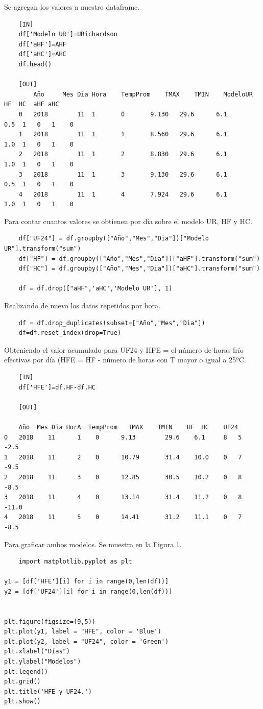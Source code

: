 \documentclass[11pt, spanish]{report}
\begin{document}
Se agregan los valores a nuestro dataframe.
\begin{verbatim}
    [IN]
    df['Modelo UR']=URichardson
    df['aHF']=AHF
    df['aHC']=AHC
    df.head()
    
    [OUT]
        Año     Mes	Dia	Hora	TempProm	TMAX	TMIN	ModeloUR	HF	HC	aHF	aHC
    0	2018        11	1   	0	    9.130	29.6	  6.1	    0.5	 1	 0	 1	  0
    1	2018        11	1   	1	    8.560	29.6	  6.1	    1.0	 1	 0	 1	  0
    2	2018        11	1   	2	    8.830	29.6	  6.1	    1.0	 1	 0	 1	  0
    3	2018        11	1   	3	    9.130	29.6	  6.1	    0.5	 1	 0	 1	  0
    4	2018        11	1   	4	    7.924	29.6	  6.1	    1.0	 1	 0	 1	  0
\end{verbatim}
Para contar cuantos valores se obtienen por día sobre el modelo UR, HF y HC.
\begin{verbatim}
    df["UF24"] = df.groupby(["Año","Mes","Dia"])["Modelo UR"].transform("sum")
    df["HF"] = df.groupby(["Año","Mes","Dia"])["aHF"].transform("sum")
    df["HC"] = df.groupby(["Año","Mes","Dia"])["aHC"].transform("sum")
    
    df = df.drop(["aHF",'aHC','Modelo UR'], 1)
\end{verbatim}
Realizando de nuevo los datos repetidos por hora.
\begin{verbatim}
    df = df.drop_duplicates(subset=["Año","Mes","Dia"])
    df=df.reset_index(drop=True)
\end{verbatim}
Obteniendo el valor acumulado para UF24 y HFE = el número de horas frío efectivas por día (HFE = HF - número de horas con T mayor o igual a 25ºC.
\begin{verbatim}
    [IN]
    df['HFE']=df.HF-df.HC
    
    [OUT]
    
    Año  Mes Dia HorA  TempProm   TMAX    TMIN    HF  HC    UF24
0   2018	11  	1 	 0      9.13	    29.6    6.1	    8   5     -2.5
1   2018	11  	2 	 0	    10.79	    31.4    10.0    0   7     -9.5
2   2018	11  	3 	 0	    12.85	    30.5    10.2    0   8     -8.5
3   2018	11  	4 	 0	    13.14	    31.4    11.2    0   8     -11.0
4   2018	11  	5 	 0	    14.41	    31.2    11.1    0   7     -8.5
\end{verbatim}
Para graficar ambos modelos. Se muestra en la Figura 1.
\begin{verbatim}
    import matplotlib.pyplot as plt

y1 = [df['HFE'][i] for i in range(0,len(df))]
y2 = [df['UF24'][i] for i in range(0,len(df))]


plt.figure(figsize=(9,5))
plt.plot(y1, label = "HFE", color = 'Blue')   
plt.plot(y2, label = "UF24", color = 'Green')   
plt.xlabel("Días")   
plt.ylabel("Modelos")  
plt.legend()
plt.grid()
plt.title('HFE y UF24.')
plt.show()
\end{verbatim}
\end{document}
